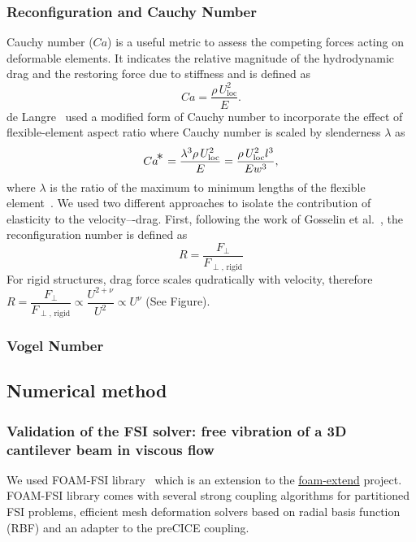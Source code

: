 \documentclass[preprint, letterpaper, nobibnotes, aps, superscriptaddress,prb]{revtex4-1}
\begin{document}
\subsubsection{Reconfiguration and Cauchy Number}
 Cauchy number ($Ca$) is a useful metric to assess the competing forces acting on deformable elements. It indicates the relative magnitude of the hydrodynamic drag and the restoring force due to stiffness and is defined as
 \begin{equation}
 Ca = \frac{\rho\,U_{\mathrm{loc}}^2}{E}.
 \end{equation}
de Langre~\cite{DeLangre08} used a modified form of Cauchy number to incorporate the effect of flexible-element aspect ratio where Cauchy number is scaled by slenderness $\lambda$ as
\begin{equation}
 Ca^{\!_{\text{\large *}}} = \frac{\lambda^3\rho\,U_{\mathrm{loc}}^2}{E} =\frac{\rho\,U_{\mathrm{loc}}^2l^3}{Ew^3} ,
\end{equation}
where $\lambda$ is the ratio of the maximum to minimum lengths of the flexible element~\cite{Chapman15}.
We used two different approaches to isolate the contribution of elasticity to the velocity–-drag. First, following the work of Gosselin et al.~\cite{Gosselin11}, the reconfiguration number is defined as
 \begin{equation}
{R} = \dfrac{F_{\perp}}{F_{\perp,\,\mathrm{rigid}}}
 \end{equation}
For rigid structures, drag force scales qudratically with velocity, therefore $ {R}=\dfrac{F_{\perp}}{F_{\perp,\,\mathrm{rigid}}} \propto \dfrac{U^{2+\nu}}{U^2}\propto U^{\nu}$ (See Figure).
\subsubsection{Vogel Number}



\subsection{Numerical method}

\subsubsection{Validation of the FSI solver: free vibration of a 3D cantilever beam in viscous flow}

We used FOAM-FSI library~\cite{Tukovic14,Tukovic18,Cardiff18} which is an extension to the \href{https://openfoamwiki.net/index.php/Installation/Linux/foam-extend-4.1}{foam-extend} project. FOAM-FSI library comes with several strong coupling algorithms for partitioned FSI problems, efficient mesh deformation solvers based on radial basis function (RBF) and an adapter to the preCICE coupling.
\end{document}
